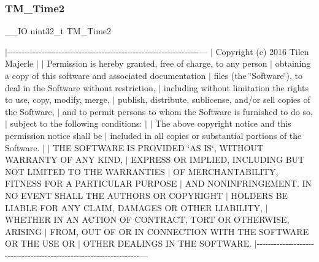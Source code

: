 \subsubsection{\texorpdfstring{T\+M\+\_\+\+Time2}{TM\_Time2}}
{\footnotesize\ttfamily \+\_\+\+\_\+\+IO uint32\+\_\+t T\+M\+\_\+\+Time2}

$\vert$-\/-\/-\/-\/-\/-\/-\/-\/-\/-\/-\/-\/-\/-\/-\/-\/-\/-\/-\/-\/-\/-\/-\/-\/-\/-\/-\/-\/-\/-\/-\/-\/-\/-\/-\/-\/-\/-\/-\/-\/-\/-\/-\/-\/-\/-\/-\/-\/-\/-\/-\/-\/-\/-\/-\/-\/-\/-\/-\/-\/-\/-\/-\/-\/-\/-\/-\/--- $\vert$ Copyright (c) 2016 Tilen Majerle $\vert$ $\vert$ Permission is hereby granted, free of charge, to any person $\vert$ obtaining a copy of this software and associated documentation $\vert$ files (the \char`\"{}\+Software\char`\"{}), to deal in the Software without restriction, $\vert$ including without limitation the rights to use, copy, modify, merge, $\vert$ publish, distribute, sublicense, and/or sell copies of the Software, $\vert$ and to permit persons to whom the Software is furnished to do so, $\vert$ subject to the following conditions\+: $\vert$ $\vert$ The above copyright notice and this permission notice shall be $\vert$ included in all copies or substantial portions of the Software. $\vert$ $\vert$ T\+HE S\+O\+F\+T\+W\+A\+RE IS P\+R\+O\+V\+I\+D\+ED \char`\"{}\+A\+S I\+S\char`\"{}, W\+I\+T\+H\+O\+UT W\+A\+R\+R\+A\+N\+TY OF A\+NY K\+I\+ND, $\vert$ E\+X\+P\+R\+E\+SS OR I\+M\+P\+L\+I\+ED, I\+N\+C\+L\+U\+D\+I\+NG B\+UT N\+OT L\+I\+M\+I\+T\+ED TO T\+HE W\+A\+R\+R\+A\+N\+T\+I\+ES $\vert$ OF M\+E\+R\+C\+H\+A\+N\+T\+A\+B\+I\+L\+I\+TY, F\+I\+T\+N\+E\+SS F\+OR A P\+A\+R\+T\+I\+C\+U\+L\+AR P\+U\+R\+P\+O\+SE $\vert$ A\+ND N\+O\+N\+I\+N\+F\+R\+I\+N\+G\+E\+M\+E\+NT. IN NO E\+V\+E\+NT S\+H\+A\+LL T\+HE A\+U\+T\+H\+O\+RS OR C\+O\+P\+Y\+R\+I\+G\+HT $\vert$ H\+O\+L\+D\+E\+RS BE L\+I\+A\+B\+LE F\+OR A\+NY C\+L\+A\+IM, D\+A\+M\+A\+G\+ES OR O\+T\+H\+ER L\+I\+A\+B\+I\+L\+I\+TY, $\vert$ W\+H\+E\+T\+H\+ER IN AN A\+C\+T\+I\+ON OF C\+O\+N\+T\+R\+A\+CT, T\+O\+RT OR O\+T\+H\+E\+R\+W\+I\+SE, A\+R\+I\+S\+I\+NG $\vert$ F\+R\+OM, O\+UT OF OR IN C\+O\+N\+N\+E\+C\+T\+I\+ON W\+I\+TH T\+HE S\+O\+F\+T\+W\+A\+RE OR T\+HE U\+SE OR $\vert$ O\+T\+H\+ER D\+E\+A\+L\+I\+N\+GS IN T\+HE S\+O\+F\+T\+W\+A\+RE. $\vert$-\/-\/-\/-\/-\/-\/-\/-\/-\/-\/-\/-\/-\/-\/-\/-\/-\/-\/-\/-\/-\/-\/-\/-\/-\/-\/-\/-\/-\/-\/-\/-\/-\/-\/-\/-\/-\/-\/-\/-\/-\/-\/-\/-\/-\/-\/-\/-\/-\/-\/-\/-\/-\/-\/-\/-\/-\/-\/-\/-\/-\/-\/-\/-\/-\/-\/-\/--- 